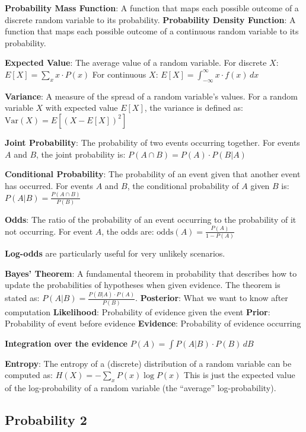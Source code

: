 \documentclass{article}
\begin{document}
\textbf{Probability Mass Function}: A function that maps each possible outcome of a discrete random variable to its probability.
\textbf{Probability Density Function}: A function that maps each possible outcome of a continuous random variable to its probability.


\textbf{Expected Value}: The average value of a random variable. For discrete $X$:
$ E[X] = \sum_{x} x \cdot P(x) $
For continuous $X$:
$ E[X] = \int_{-\infty}^{\infty} x \cdot f(x) \, dx $

\textbf{Variance}: A measure of the spread of a random variable's values. For a random variable $X$ with expected value $E[X]$, the variance is defined as:
$ \text{Var}(X) = E[(X - E[X])^2] $


\textbf{Joint Probability}: The probability of two events occurring together. For events $A$ and $B$, the joint probability is:
$ P(A \cap B) = P(A) \cdot P(B|A) $

\textbf{Conditional Probability}: The probability of an event given that another event has occurred. For events $A$ and $B$, the conditional probability of $A$ given $B$ is:
$ P(A|B) = \frac{P(A \cap B)}{P(B)} $

\textbf{Odds}: The ratio of the probability of an event occurring to the probability of it not occurring. For event $A$, the odds are:
$ \text{odds}(A) = \frac{P(A)}{1 - P(A)} $

\textbf{Log-odds} are particularly useful for very unlikely scenarios.

\textbf{Bayes' Theorem}: A fundamental theorem in probability that describes how to update the probabilities of hypotheses when given evidence. The theorem is stated as:
$ P(A|B) = \frac{P(B|A) \cdot P(A)}{P(B)} $.
\textbf{Posterior}: What we want to know after computation
\textbf{Likelihood}: Probability of evidence given the event
\textbf{Prior}: Probability of event before evidence
\textbf{Evidence}: Probability of evidence occurring

\textbf{Integration over the evidence}
$ P(A) = \int P(A|B) \cdot P(B) \, dB $

\textbf{Entropy}:
The entropy of a (discrete) distribution of a random variable can be
computed as:
$ H(X) = - \sum_{x} P(x) \log P(x) $
This is just the expected value of the log-probability of a random variable
(the “average” log-probability).


\subsection*{Probability 2}
\end{document}
